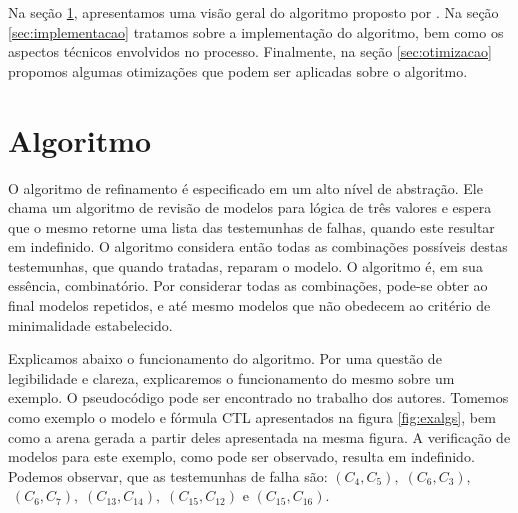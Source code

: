 \documentclass[normaltoc,capchap,capsec,times]{abnt}
\begin{document}
Na seção \ref{sec:algabstr}, apresentamos uma visão geral do algoritmo proposto por \cite{aline}. Na seção \ref{sec:implementacao} tratamos sobre a implementação do algoritmo, bem como os aspectos técnicos envolvidos no processo. Finalmente, na seção \ref{sec:otimizacao} propomos algumas otimizações que podem ser aplicadas sobre o algoritmo.

\section{Algoritmo}
\label{sec:algabstr}

O algoritmo de refinamento é especificado em um alto nível de abstração. Ele chama um algoritmo de revisão de modelos para lógica de três valores e espera que o mesmo retorne uma lista das testemunhas de falhas, quando este resultar em indefinido. O algoritmo considera então todas as combinações possíveis destas testemunhas, que quando tratadas, reparam o modelo. O algoritmo é, em sua essência, combinatório. Por considerar todas as combinações, pode-se obter ao final modelos repetidos, e até mesmo modelos que não obedecem ao critério de minimalidade estabelecido. %
 
Explicamos abaixo o funcionamento do algoritmo. Por uma questão de legibilidade e clareza, explicaremos o funcionamento do mesmo sobre um exemplo. O pseudocódigo pode ser encontrado no trabalho dos autores. Tomemos como exemplo o modelo e fórmula CTL apresentados na figura \ref{fig:exalgs}, bem como a arena gerada a partir deles apresentada na mesma figura. A verificação de modelos para este exemplo, como pode ser observado, resulta em indefinido. Podemos observar, que as testemunhas de falha são: $(C_4,C_5), \; (C_6,C_3)$, $ \; (C_6,C_7), \; (C_{13},C_{14}), \; (C_{15}, C_{12})$ e $(C_{15}, C_{16}) $.
\end{document}
